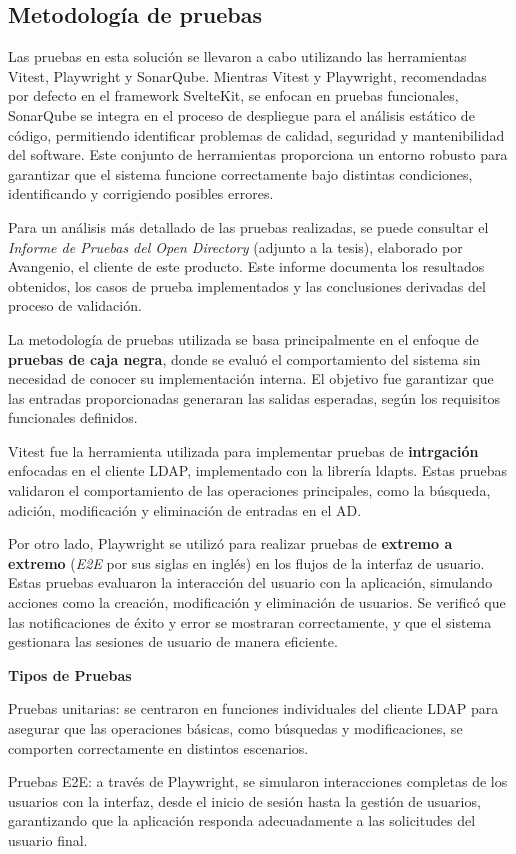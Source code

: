 \subsection{Metodología de pruebas}

Las pruebas en esta solución se llevaron a cabo utilizando las herramientas Vitest, Playwright y SonarQube. Mientras Vitest y Playwright, recomendadas por defecto en el framework SvelteKit, se enfocan en pruebas funcionales, SonarQube se integra en el proceso de despliegue para el análisis estático de código, permitiendo identificar problemas de calidad, seguridad y mantenibilidad del software. Este conjunto de herramientas proporciona un entorno robusto para garantizar que el sistema funcione correctamente bajo distintas condiciones, identificando y corrigiendo posibles errores.

Para un análisis más detallado de las pruebas realizadas, se puede consultar el \textit{Informe de Pruebas del Open Directory} \autocite{avangenio_srl_informe_nodate} (adjunto a la tesis), elaborado por Avangenio, el cliente de este producto. Este informe documenta los resultados obtenidos, los casos de prueba implementados y las conclusiones derivadas del proceso de validación.

La metodología de pruebas utilizada se basa principalmente en el enfoque de \textbf{pruebas de caja negra}, donde se evaluó el comportamiento del sistema sin necesidad de conocer su implementación interna. El objetivo fue garantizar que las entradas proporcionadas generaran las salidas esperadas, según los requisitos funcionales definidos.

Vitest fue la herramienta utilizada para implementar pruebas de \textbf{intrgación} enfocadas en el cliente LDAP, implementado con la librería ldapts. Estas pruebas validaron el comportamiento de las operaciones principales, como la búsqueda, adición, modificación y eliminación de entradas en el AD.

Por otro lado, Playwright se utilizó para realizar pruebas de \textbf{extremo a extremo} (\textit{E2E} por sus siglas en inglés) en los flujos de la interfaz de usuario. Estas pruebas evaluaron la interacción del usuario con la aplicación, simulando acciones como la creación, modificación y eliminación de usuarios. Se verificó que las notificaciones de éxito y error se mostraran correctamente, y que el sistema gestionara las sesiones de usuario de manera eficiente.

\textbf{Tipos de Pruebas}

Pruebas unitarias: se centraron en funciones individuales del cliente LDAP para asegurar que las operaciones básicas, como búsquedas y modificaciones, se comporten correctamente en distintos escenarios.

Pruebas E2E: a través de Playwright, se simularon interacciones completas de los usuarios con la interfaz, desde el inicio de sesión hasta la gestión de usuarios, garantizando que la aplicación responda adecuadamente a las solicitudes del usuario final.
